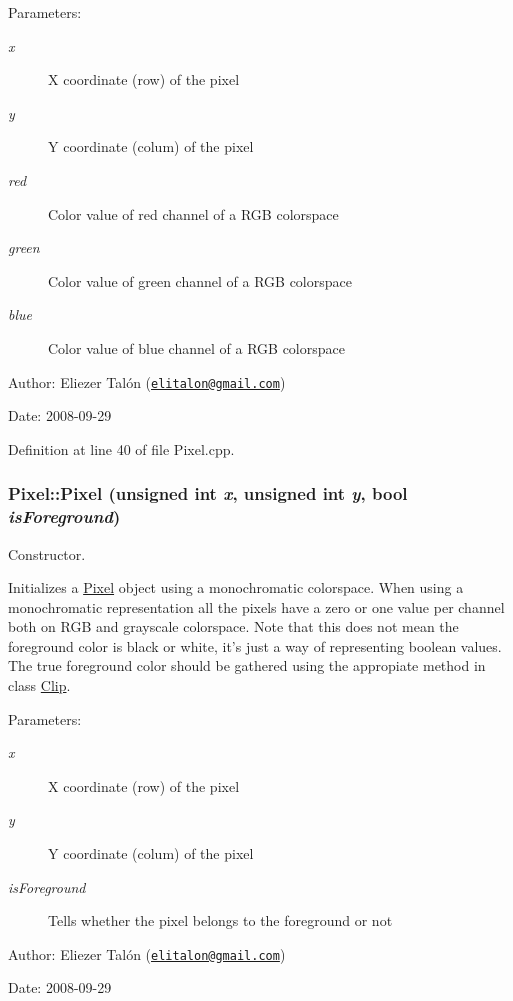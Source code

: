 \begin{Desc}
\item[Parameters:]
\begin{description}
\item[{\em x}]X coordinate (row) of the pixel \item[{\em y}]Y coordinate (colum) of the pixel \item[{\em red}]Color value of red channel of a RGB colorspace \item[{\em green}]Color value of green channel of a RGB colorspace \item[{\em blue}]Color value of blue channel of a RGB colorspace\end{description}
\end{Desc}
\begin{Desc}
\item[Author:]Eliezer Talón (\href{mailto:elitalon@gmail.com}{\tt elitalon@gmail.com}) \end{Desc}
\begin{Desc}
\item[Date:]2008-09-29 \end{Desc}


Definition at line 40 of file Pixel.cpp.\hypertarget{class_pixel_3138f81f8e7ea10f6764f47136129ad0}{
\subsubsection[Pixel]{\setlength{\rightskip}{0pt plus 5cm}Pixel::Pixel (unsigned int {\em x}, \/  unsigned int {\em y}, \/  bool {\em isForeground})}}
\label{class_pixel_3138f81f8e7ea10f6764f47136129ad0}


Constructor. 

Initializes a \hyperlink{class_pixel}{Pixel} object using a monochromatic colorspace. When using a monochromatic representation all the pixels have a zero or one value per channel both on RGB and grayscale colorspace. Note that this does not mean the foreground color is black or white, it's just a way of representing boolean values. The true foreground color should be gathered using the appropiate method in class \hyperlink{class_clip}{Clip}.

\begin{Desc}
\item[Parameters:]
\begin{description}
\item[{\em x}]X coordinate (row) of the pixel \item[{\em y}]Y coordinate (colum) of the pixel \item[{\em isForeground}]Tells whether the pixel belongs to the foreground or not\end{description}
\end{Desc}
\begin{Desc}
\item[Author:]Eliezer Talón (\href{mailto:elitalon@gmail.com}{\tt elitalon@gmail.com}) \end{Desc}
\begin{Desc}
\item[Date:]2008-09-29 \end{Desc}


